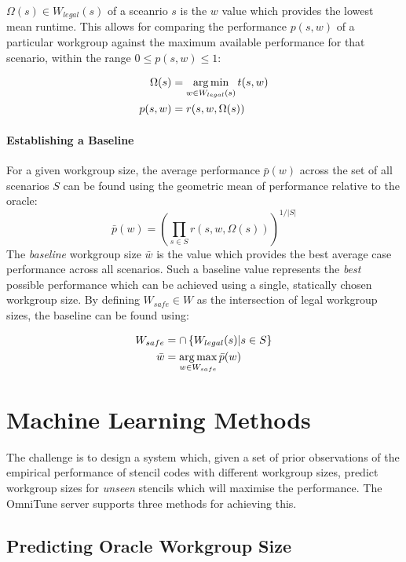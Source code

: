 \documentclass[nonatbib,preprint,10pt]{sigplanconf}
\begin{document}
$\Omega(s) \in W_{legal}(s)$ of a sceanrio $s$ is the $w$ value which
provides the lowest mean runtime. This allows for comparing the
performance $p(s,w)$ of a particular workgroup against the maximum
available performance for that scenario, within the range
$0 \le p(s,w) \le 1$:

\begin{align}
  \Omega(s) &= \operatorname*{arg\,min}_{w \in W_{legal}(s)} t(s,w)\\
  p(s,w) &= r(s, w, \Omega(s))
\end{align}


\paragraph{Establishing a Baseline} For a given workgroup size, the
average performance $\bar{p}(w)$ across the set of all scenarios $S$
can be found using the geometric mean of performance relative to the
oracle:
%
\begin{equation}
\bar{p}(w) =
\left(
  \prod_{s \in S} r(s, w, \Omega(s))
\right)^{1/|S|}
\end{equation}
%
The \emph{baseline} workgroup size $\bar{w}$ is the value which
provides the best average case performance across all scenarios. Such
a baseline value represents the \emph{best} possible performance which
can be achieved using a single, statically chosen workgroup size. By
defining $W_{safe} \in W$ as the intersection of legal workgroup
sizes, the baseline can be found using:

\begin{align}
W_{safe} &= \cap \left\{ W_{legal}(s) | s \in S \right\}\\
\bar{w} &= \operatorname*{arg\,max}_{w \in W_{safe}} \bar{p}(w)
\end{align}


\section{Machine Learning Methods}

The challenge is to design a system which, given a set of prior
observations of the empirical performance of stencil codes with
different workgroup sizes, predict workgroup sizes for \emph{unseen}
stencils which will maximise the performance. The OmniTune server
supports three methods for achieving this.


\subsection{Predicting Oracle Workgroup Size}
\end{document}
